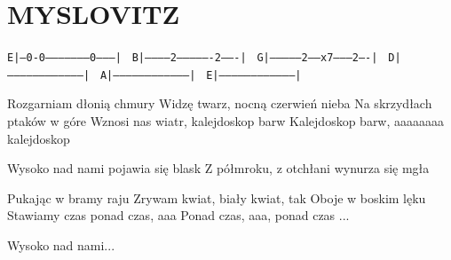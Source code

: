 \documentclass[../../../songbook.tex]{subfiles}
\begin{document}
\TabPositions{8cm} %
\section*{MYSLOVITZ}
{}
\vspace{0.5cm}
 \texttt{E|---0-0--------------------0---------|	}	\newline
 \texttt{B|-----------2----------------2-------|	}	\newline
 \texttt{G|---------------2-----x7--------2----|	}	\newline
 \texttt{D|------------------------------------|	}	\newline
 \texttt{A|------------------------------------|	}	\newline
 \texttt{E|------------------------------------|	}	\newline


Rozgarniam dłonią chmury				 \newline
Widzę twarz, nocną czerwień nieba		 \newline
Na skrzydłach ptaków w góre \newline
Wznosi nas wiatr, kalejdoskop barw	   \newline 
Kalejdoskop barw, aaaaaaaa kalejdoskop	  \newline


\-\hspace{1cm} Wysoko nad nami pojawia się blask		  \newline
\-\hspace{1cm} Z półmroku, z otchłani wynurza się mgła	  \newline

Pukając w bramy raju  \newline
Zrywam kwiat, biały kwiat, tak \newline
Oboje w boskim lęku \newline
Stawiamy czas ponad czas, aaa \newline
Ponad czas, aaa, ponad czas ... \newline

\-\hspace{1cm} Wysoko nad nami... \newline
\end{document}
